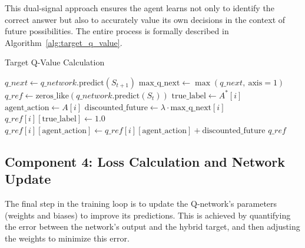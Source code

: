 \documentclass[12pt]{report}
\begin{document}
This dual-signal approach ensures the agent learns not only to identify the correct answer but also to accurately value its own decisions in the context of future possibilities. The entire process is formally described in Algorithm~\ref{alg:target_q_value}.

\begin{algorithm}[H]
\caption{Target Q-Value Calculation}
\label{alg:target_q_value}
\begin{algorithmic}[1]
    \State $q\_next \gets q\_network.\text{predict}(S_{t+1})$
    \State $\text{max\_q\_next} \gets \max(q\_next,\ \text{axis}=1)$
    \State $q\_ref \gets \text{zeros\_like}(q\_network.\text{predict}(S_t))$
        \State $\text{true\_label} \gets A^*[i]$
        \State $\text{agent\_action} \gets A[i]$
        \State $\text{discounted\_future} \gets \lambda \cdot \text{max\_q\_next}[i]$
        \State $q\_ref[i][\text{true\_label}] \gets 1.0$
        \State $q\_ref[i][\text{agent\_action}] \gets q\_ref[i][\text{agent\_action}] + \text{discounted\_future}$
    \EndFor
    \State \Return $q\_ref$
\EndFunction
\end{algorithmic}
\end{algorithm}

\subsection{Component 4: Loss Calculation and Network Update}

The final step in the training loop is to update the Q-network’s parameters (weights and biases) to improve its predictions. This is achieved by quantifying the error between the network’s output and the hybrid target, and then adjusting the weights to minimize this error.
\end{document}
